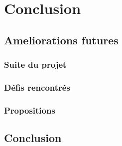 \chapter{Conclusion}
        \section{Ameliorations futures}
        \subsection{Suite du projet}
        \lipsum[1]
         \subsection{Défis rencontrés}
        \lipsum[1]
         \subsection{Propositions}
        \lipsum[1]
        \section{Conclusion}
                     